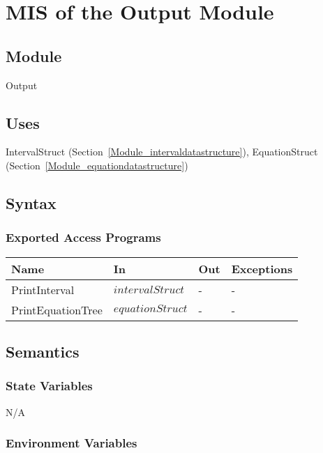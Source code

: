 \documentclass[12pt, titlepage]{article}
\begin{document}
\section{MIS of the Output Module} 
\label{Module_output}

\subsection{Module}

Output

\subsection{Uses}

IntervalStruct (Section~\ref{Module_intervaldatastructure}), EquationStruct 
(Section~\ref{Module_equationdatastructure})

\subsection{Syntax}

\subsubsection{Exported Access Programs}

\begin{center}
	\begin{tabular}{p{3.1cm} p{3cm} p{3cm} p{5cm}}
		\hline
		\textbf{Name} & \textbf{In} & \textbf{Out} & \textbf{Exceptions} \\
		\hline
		PrintInterval & $intervalStruct$ & - & - \\
		PrintEquationTree & $equationStruct$ & - & - \\
		\hline
	\end{tabular}
\end{center}

\subsection{Semantics}

\subsubsection{State Variables}

N/A

\subsubsection{Environment Variables}
\end{document}
